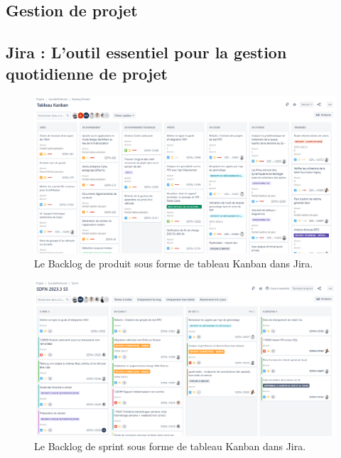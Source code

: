 \begin{appendices}

    \chapter{Gestion de projet}\label{ch-a:gestion-projet}

    \section[Jira : L'outil pour la gestion de projet]{Jira : L'outil essentiel pour la gestion quotidienne de projet}\label{sec-a:jira}

    \begin{figure}[ht]
        \centering
        \includegraphics[width=\textwidth]{img/product-backlog}
        \caption{Le Backlog de produit sous forme de tableau Kanban dans Jira.}
        \label{fig:product-backlog}
    \end{figure}

    \begin{figure}[ht]
        \centering
        \includegraphics[width=\textwidth]{img/sprint}
        \caption{Le Backlog de sprint sous forme de tableau Kanban dans Jira.}
        \label{fig:sprint-backlog}
    \end{figure}


\end{appendices}
